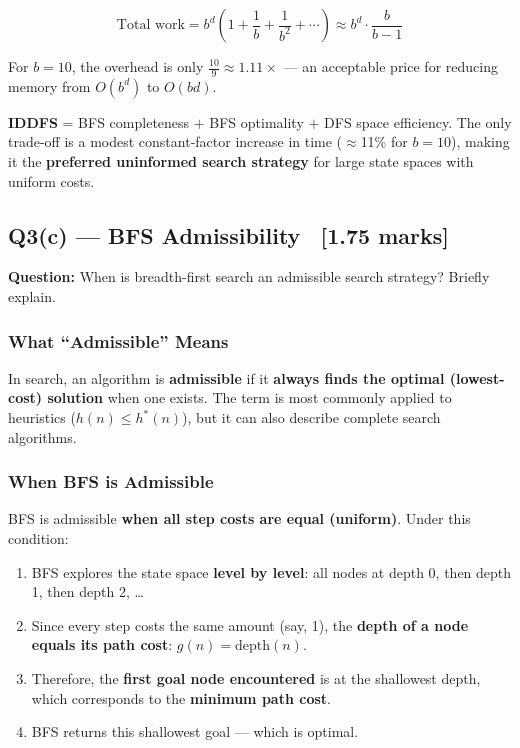 \documentclass[12pt, a4paper]{article}
\newenvironment{solutionbox}{\begin{mdframed}[style=solutionframe]}{\end{mdframed}}
\newenvironment{answerbox}{\begin{mdframed}[style=answerframe]}{\end{mdframed}}
\begin{document}
\[
\text{Total work} = b^d \!\left(1 + \frac{1}{b} + \frac{1}{b^2} + \cdots\right)
\approx b^d \cdot \frac{b}{b-1}
\]

For $b=10$, the overhead is only $\frac{10}{9} \approx 1.11\times$ — an acceptable price for reducing memory from $O(b^d)$ to $O(bd)$.

\vspace{0.4em}

\begin{answerbox}
\textbf{IDDFS} = BFS completeness $+$ BFS optimality $+$ DFS space efficiency.
The only trade-off is a modest constant-factor increase in time ($\approx$11\% for $b{=}10$),
making it the \textbf{preferred uninformed search strategy} for large state spaces with uniform costs.
\end{answerbox}

\subsection{Q3(c) — BFS Admissibility \ [1.75 marks]}

\begin{solutionbox}
\textbf{Question:} When is breadth-first search an admissible search strategy? Briefly explain.
\end{solutionbox}

\subsubsection*{What ``Admissible'' Means}

In search, an algorithm is \textbf{admissible} if it \textbf{always finds the optimal (lowest-cost) solution} when one exists. The term is most commonly applied to heuristics ($h(n) \leq h^*(n)$), but it can also describe complete search algorithms.

\subsubsection*{When BFS is Admissible}

BFS is admissible \textbf{when all step costs are equal (uniform)}. Under this condition:

\begin{enumerate}[noitemsep]
  \item BFS explores the state space \textbf{level by level}: all nodes at depth 0, then depth 1, then depth 2, \ldots
  \item Since every step costs the same amount (say, 1), the \textbf{depth of a node equals its path cost}: $g(n) = \text{depth}(n)$.
  \item Therefore, the \textbf{first goal node encountered} is at the shallowest depth, which corresponds to the \textbf{minimum path cost}.
  \item BFS returns this shallowest goal — which is optimal.
\end{enumerate}
\end{document}
